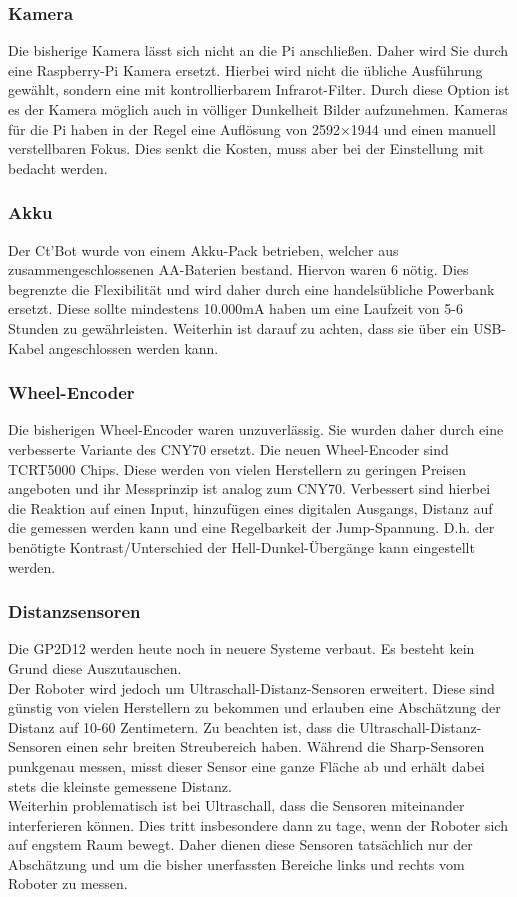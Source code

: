 \documentclass[a4paper,cleardoubleempty,BCOR1cm]{book}
\begin{document}
\subsubsection{Kamera}
Die bisherige Kamera lässt sich nicht an die Pi anschließen. Daher wird Sie durch eine Raspberry-Pi Kamera ersetzt. Hierbei wird nicht die übliche Ausführung gewählt, sondern eine mit kontrollierbarem Infrarot-Filter. Durch diese Option ist es der Kamera möglich auch in völliger Dunkelheit Bilder aufzunehmen. Kameras für die Pi haben in der Regel eine Auflösung von 2592×1944 und einen manuell verstellbaren Fokus. Dies senkt die Kosten, muss aber bei der Einstellung mit bedacht werden.

\subsubsection{Akku}
Der Ct'Bot wurde von einem Akku-Pack betrieben, welcher aus zusammengeschlossenen AA-Baterien bestand. Hiervon waren 6 nötig. Dies begrenzte die Flexibilität und wird daher durch eine handelsübliche Powerbank ersetzt. Diese sollte mindestens 10.000mA haben um eine Laufzeit von 5-6 Stunden zu gewährleisten. Weiterhin ist darauf zu achten, dass sie über ein USB-Kabel angeschlossen werden kann. 

\subsubsection{Wheel-Encoder}
Die bisherigen Wheel-Encoder waren unzuverlässig. Sie wurden daher durch eine verbesserte Variante des CNY70 ersetzt. Die neuen Wheel-Encoder sind TCRT5000 Chips. Diese werden von vielen Herstellern zu geringen Preisen angeboten und ihr Messprinzip ist analog zum CNY70. Verbessert sind hierbei die Reaktion auf einen Input, hinzufügen eines digitalen Ausgangs, Distanz auf die gemessen werden kann und eine Regelbarkeit der Jump-Spannung. D.h. der benötigte Kontrast/Unterschied der Hell-Dunkel-Übergänge kann eingestellt werden. 

\subsubsection{Distanzsensoren}
Die GP2D12 werden heute noch in neuere Systeme verbaut. Es besteht kein Grund diese Auszutauschen. \\
Der Roboter wird jedoch um Ultraschall-Distanz-Sensoren erweitert. Diese sind günstig von vielen Herstellern zu bekommen und erlauben eine Abschätzung der Distanz auf 10-60 Zentimetern. Zu beachten ist, dass die Ultraschall-Distanz-Sensoren einen sehr breiten Streubereich haben. Während die Sharp-Sensoren punkgenau messen, misst dieser Sensor eine ganze Fläche ab und erhält dabei stets die kleinste gemessene Distanz.\\
Weiterhin problematisch ist bei Ultraschall, dass die Sensoren miteinander interferieren können. Dies tritt insbesondere dann zu tage, wenn der Roboter sich auf engstem Raum bewegt. Daher dienen diese Sensoren tatsächlich nur der Abschätzung und um die bisher unerfassten Bereiche links und rechts vom Roboter zu messen. 
\end{document}
